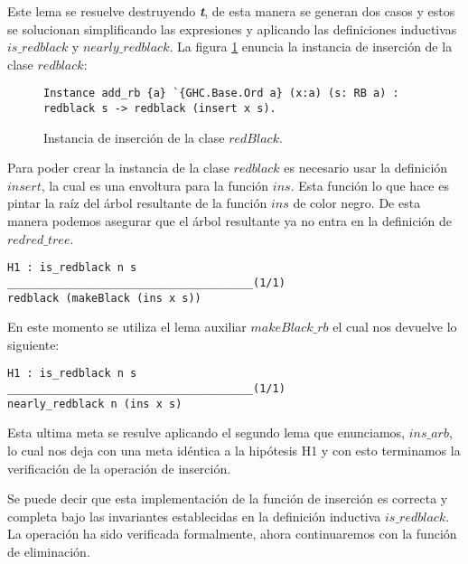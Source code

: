 Este lema se resuelve destruyendo \textit{\textbf{t}}, de esta manera se generan dos casos y estos se solucionan
simplificando las expresiones y aplicando las definiciones inductivas $is\_redblack$ y
$nearly\_redblack$.
La figura \ref{instance_ins} enuncia la instancia de inserci\'on de la clase $redblack$:

\begin{figure}[!ht]
\centering
\captionsetup{justification=centering}
\begin{verbatim}
Instance add_rb {a} `{GHC.Base.Ord a} (x:a) (s: RB a) :
redblack s -> redblack (insert x s).
\end{verbatim}
\caption{Instancia de inserci\'on de la clase $redBlack$.}
\label{instance_ins}
\end{figure}

Para poder crear la instancia de la clase $redblack$ es necesario usar la definici\'on $insert$,
la cual es una envoltura para la funci\'on $ins$. Esta funci\'on lo que hace es pintar la
ra\'iz del \'arbol resultante de la funci\'on $ins$ de color negro. De esta manera podemos
asegurar que el \'arbol resultante ya no entra en la definici\'on de $redred\_tree$.

\begin{verbatim}
H1 : is_redblack n s
______________________________________(1/1)
redblack (makeBlack (ins x s))
\end{verbatim}

En este momento se utiliza el lema auxiliar $makeBlack\_rb$ el cual nos devuelve lo siguiente:

\begin{verbatim}
H1 : is_redblack n s
______________________________________(1/1)
nearly_redblack n (ins x s)
\end{verbatim}

Esta ultima meta se resulve aplicando el segundo lema que enunciamos, $ins\_arb$, lo cual nos deja
con una meta idéntica a la hipótesis H1 y con esto terminamos la verificaci\'on de la operaci\'on
de inserci\'on.

Se puede decir que esta implementaci\'on de la funci\'on de inserci\'on es correcta y completa
bajo las invariantes establecidas en la definici\'on inductiva $is\_redblack$. La operaci\'on ha
sido verificada formalmente, ahora continuaremos con la funci\'on de eliminaci\'on.
